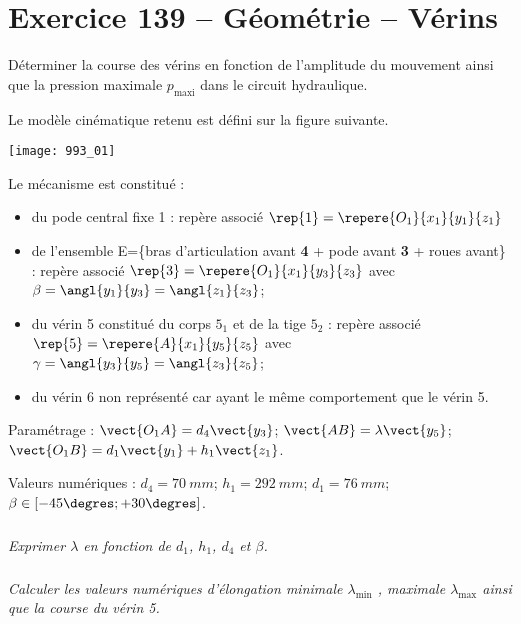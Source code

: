 \section*{Exercice 139 -- Géométrie -- Vérins}
\setcounter{exo}{0}

\begin{obj}
Déterminer la course des vérins en fonction de l’amplitude du mouvement ainsi que la pression maximale $p_{\text{maxi}}$ dans le circuit hydraulique.
\end{obj}

Le modèle cinématique retenu est défini sur la figure suivante.


\begin{center}
\texttt{[image: 993\_01]}
\end{center}

Le mécanisme est constitué :
\begin{itemize}
\item du pode central fixe 1 : repère associé $\rep{1}=\repere{O_1}{x_1}{y_1}{z_1}$
\item de l’ensemble E=\{bras d’articulation avant \textbf{4} + pode avant \textbf{3} + roues avant\} : repère associé 
$\rep{3}=\repere{O_1}{x_1}{y_3}{z_3}$ avec $\beta=\angl{y_1}{y_3}=\angl{z_1}{z_3}$;
\item du vérin 5 constitué du corps $5_1$ et de la tige $5_2$ : repère associé $\rep{5}=\repere{A}{x_1}{y_5}{z_5}$ 
 avec $\gamma=\angl{y_3}{y_5}=\angl{z_3}{z_5}$;
\item du vérin 6 non représenté car ayant le même comportement que le vérin 5.
\end{itemize}

Paramétrage : $\vect{O_1A}=d_4\vect{y_3}$; $\vect{AB}=\lambda\vect{y_5}$; $\vect{O_1B}=d_1\vect{y_1}+h_1\vect{z_1}$.

Valeurs numériques : $d_4 = \SI{70}{mm}$; $h_1 = \SI{292}{mm}$; $d_1 = \SI{76}{mm}$; $\beta\in\left[-45\degres;+30\degres\right]$.



\subparagraph{}
\textit{Exprimer $\lambda$ en fonction de $d_1$, $h_1$, $d_4$ et $\beta$.}
\ifprof
\begin{corrige}
\end{corrige}
\else
\fi


\subparagraph{}
\textit{Calculer les valeurs numériques d’élongation minimale $\lambda_{\text{min}}$ , maximale $\lambda_{\text{max}}$ ainsi que la course du vérin 5.}
\ifprof
\begin{corrige}
\end{corrige}
\else
\fi


